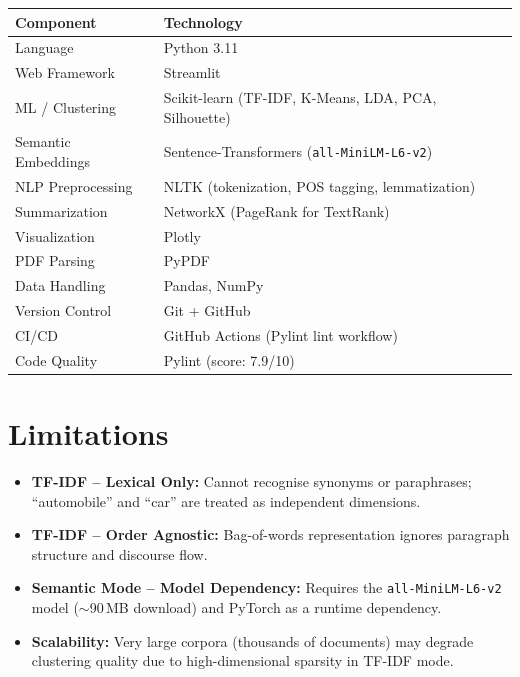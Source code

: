 \documentclass[12pt, a4paper]{article}
\begin{document}
\begin{table}[H]
\centering
\begin{tabular}{@{}ll@{}}
\toprule
\textbf{Component} & \textbf{Technology} \\
\midrule
Language & Python 3.11 \\
Web Framework & Streamlit \\
ML / Clustering & Scikit-learn (TF-IDF, K-Means, LDA, PCA, Silhouette) \\
Semantic Embeddings & Sentence-Transformers (\texttt{all-MiniLM-L6-v2}) \\
NLP Preprocessing & NLTK (tokenization, POS tagging, lemmatization) \\
Summarization & NetworkX (PageRank for TextRank) \\
Visualization & Plotly \\
PDF Parsing & PyPDF \\
Data Handling & Pandas, NumPy \\
Version Control & Git + GitHub \\
CI/CD & GitHub Actions (Pylint lint workflow) \\
Code Quality & Pylint (score: 7.9/10) \\
\bottomrule
\end{tabular}
\end{table}

\section{Limitations}

\begin{itemize}[nosep]
    \item \textbf{TF-IDF -- Lexical Only:} Cannot recognise synonyms or paraphrases; ``automobile'' and ``car'' are treated as independent dimensions.
    \item \textbf{TF-IDF -- Order Agnostic:} Bag-of-words representation ignores paragraph structure and discourse flow.
    \item \textbf{Semantic Mode -- Model Dependency:} Requires the \texttt{all-MiniLM-L6-v2} model ($\sim$90\,MB download) and PyTorch as a runtime dependency.
    \item \textbf{Scalability:} Very large corpora (thousands of documents) may degrade clustering quality due to high-dimensional sparsity in TF-IDF mode.
\end{itemize}
\end{document}
